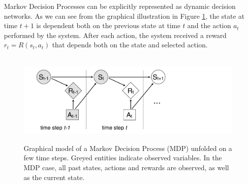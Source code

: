 Markov Decision Processes can be explicitly represented as dynamic decision networks.  As we can see from the graphical illustration in Figure \ref{fig:mdp}, the state at time $t+1$ is dependent both on the previous state at time $t$ and the action $a_t$ performed by the system. After each action, the system received a reward $r_t = R(s_t, a_t)$ that depends both on the state and selected action. 

\begin{figure}[h]
$\phantom{d}$\hspace{20mm}
\includegraphics[scale=0.25]{imgs/MDP.pdf}
\caption{Graphical model of a Markov Decision Process (MDP) unfolded on a few time steps.  Greyed entities indicate observed variables. In the MDP case, all past states, actions and rewards are observed, as well as the current state.}
\label{fig:mdp}
\end{figure}


